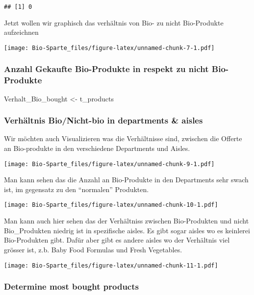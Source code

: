 \documentclass[]{article}
\newenvironment{Shaded}{\begin{snugshade}}{\end{snugshade}}
\newcommand{\NormalTok}[1]{#1}
\newcommand{\StringTok}[1]{\textcolor[rgb]{0.31,0.60,0.02}{#1}}
\begin{document}
\begin{verbatim}
## [1] 0
\end{verbatim}

Jetzt wollen wir graphisch das verhältnis von Bio- zu nicht Bio-Produkte
aufzeichnen

\texttt{[image: Bio-Sparte\_files/figure-latex/unnamed-chunk-7-1.pdf]}

\hypertarget{anzahl-gekaufte-bio-produkte-in-respekt-zu-nicht-bio-produkte}{%
\subsubsection{Anzahl Gekaufte Bio-Produkte in respekt zu nicht
Bio-Produkte}\label{anzahl-gekaufte-bio-produkte-in-respekt-zu-nicht-bio-produkte}}

\begin{Shaded}
\begin{Highlighting}[]
\NormalTok{Verhalt_Bio_bought <-}\StringTok{ }\NormalTok{t_products}
\end{Highlighting}
\end{Shaded}

\hypertarget{verhuxe4ltnis-bionicht-bio-in-departments-aisles}{%
\subsubsection{Verhältnis Bio/Nicht-bio in departments \&
aisles}\label{verhuxe4ltnis-bionicht-bio-in-departments-aisles}}

Wir möchten auch Visualizieren was die Verhältnisse sind, zwischen die
Offerte an Bio-produkte in den verschiedene Departments und Aisles.

\texttt{[image: Bio-Sparte\_files/figure-latex/unnamed-chunk-9-1.pdf]}

Man kann sehen das die Anzahl an Bio-Produkte in den Departments sehr
swach ist, im gegensatz zu den ``normalen'' Produkten.

\texttt{[image: Bio-Sparte\_files/figure-latex/unnamed-chunk-10-1.pdf]}

Man kann auch hier sehen das der Verhältniss zwischen Bio-Produkten und
nicht Bio\_Produkten niedrig ist in spezifische aisles. Es gibt sogar
aisles wo es keinlerei Bio-Produkten gibt. Dafür aber gibt es andere
aisles wo der Verhältnis viel grösser ist, z.b. Baby Food Formulas und
Fresh Vegetables.

\texttt{[image: Bio-Sparte\_files/figure-latex/unnamed-chunk-11-1.pdf]}

\hypertarget{determine-most-bought-products}{%
\subsubsection{Determine most bought
products}\label{determine-most-bought-products}}
\end{document}
